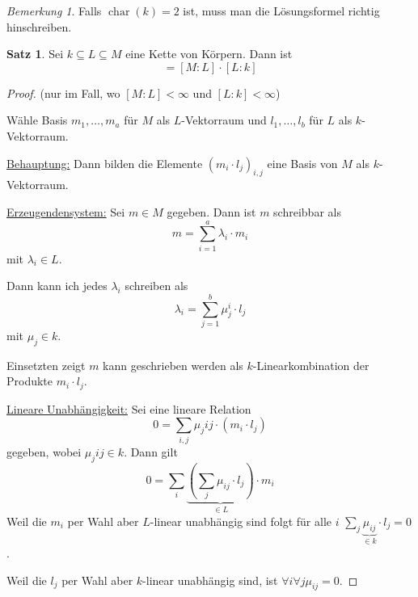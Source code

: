 \documentclass[12pt,parskip=full]{scrartcl}
\newcommand{\heading}{\underline}
\DeclareMathOperator{\charac}{char}
\theoremstyle{definition}
\newtheorem{theorem}{Satz}[section]
\theoremstyle{remark}
\newtheorem*{remark}{Bemerkung}
\begin{document}
	\begin{remark}
		Falls $\charac(k) = 2$ ist, muss man die Lösungsformel richtig hinschreiben.
	\end{remark}

	\begin{theorem}
		Sei $k \subseteq L \subseteq M$ eine Kette von Körpern. Dann ist
		\begin{equation*}
			[M:k] = [M:L] \cdot [L:k]
		\end{equation*}
	\end{theorem}

	\begin{proof}(nur im Fall, wo $[M:L] < \infty$ und $[L:k] < \infty$)

		Wähle Basis $m_1, \dots, m_a$ für $M$ als $L$-Vektorraum und $l_1, \dots, l_b$ für $L$ als $k$-Vektorraum.
		
		\heading{Behauptung:} Dann bilden die Elemente $(m_i \cdot l_j)_{i,j}$ eine Basis von $M$ als $k$-Vektorraum.
		
		\heading{Erzeugendensystem:} Sei $m \in M$ gegeben. Dann ist $m$ schreibbar als 
		\begin{equation*}
			m = \sum_{i = 1}^{a} \lambda_i \cdot m_i
		\end{equation*}
		mit $\lambda_i \in L$.
		
		Dann kann ich jedes $\lambda_i$ schreiben als
		\begin{equation*}
			\lambda_i = \sum_{j = 1}^{b} \mu_j^i \cdot l_j
		\end{equation*}
		mit $\mu_j \in k$.
		
		Einsetzten zeigt $m$ kann geschrieben werden als $k$-Linearkombination der Produkte $m_i \cdot l_j$.
		
		\heading{Lineare Unabhängigkeit:} Sei eine lineare Relation
		\begin{equation*}
			0 = \sum_{i,j} \mu_j{ij} \cdot (m_i \cdot l_j)
		\end{equation*}
		gegeben, wobei $\mu_j{ij} \in k$. Dann gilt
		\begin{equation*}
			0 = \sum_{i} \underbrace{\left( \sum_{j} \mu_{ij} \cdot l_j \right)}_{\in L} \cdot m_i
		\end{equation*}
		Weil die $m_i$ per Wahl aber $L$-linear unabhängig sind folgt für alle $i$ $\sum_{j} \underbrace{\mu_{ij}}_{\in k} \cdot l_j = 0$.
		
		Weil die $l_j$ per Wahl aber $k$-linear unabhängig sind, ist $\forall i \forall j \mu_{ij} = 0$.
	\end{proof}
\end{document}
